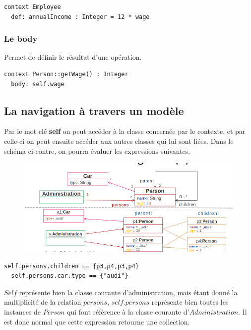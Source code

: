 \documentclass[../Syllabus.tex]{subfiles}
\begin{document}
\begin{lstlisting}[language=OCL]
  context Employee
  def: annualIncome : Integer = 12 * wage
\end{lstlisting}

\subsubsection{Le body}

Permet de définir le résultat d'une opération.

\begin{lstlisting}[language=OCL]
  context Person::getWage() : Integer
  body: self.wage
\end{lstlisting}

\newpage

\subsection{La navigation à travers un modèle}

Par le mot clé \textbf{self} on peut accéder à la classe concernée par le contexte, et par celle-ci on peut ensuite accéder aux autres classes qui lui sont liées. Dans le schéma ci-contre, on pourra évaluer les expressions suivantes.

\begin{figure}
  \includegraphics[scale=0.35]{img/exempleNavigation1.png}
\end{figure}

\noindent\begin{lstlisting}[language=OCL]
  self.persons.children == {p3,p4,p3,p4}
  self.persons.car.type == {"audi"}
\end{lstlisting}

$Self$ représente bien la classe courante d'administration, mais étant donné la multiplicité de la relation $persons$, $self.persons$ représente bien toutes les instances de $Person$ qui font référence à la classe courante d'$Administration$. Il est donc normal que cette expression retourne une collection.
\end{document}
